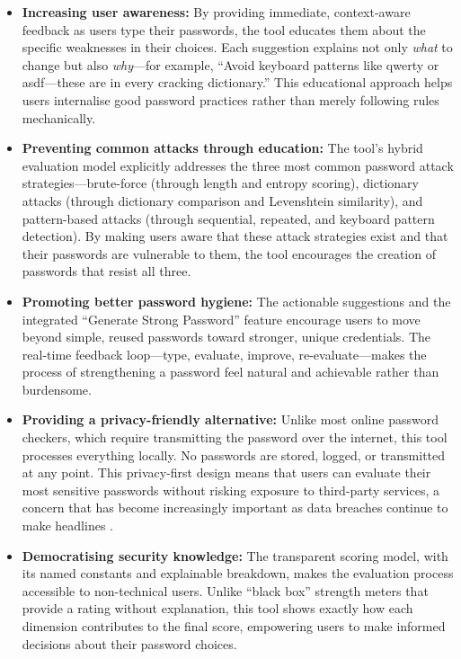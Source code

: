 \begin{itemize}
    \item \textbf{Increasing user awareness:} By providing immediate, context-aware feedback as users type their passwords, the tool educates them about the specific weaknesses in their choices. Each suggestion explains not only \textit{what} to change but also \textit{why}---for example, ``Avoid keyboard patterns like qwerty or asdf---these are in every cracking dictionary.'' This educational approach helps users internalise good password practices rather than merely following rules mechanically.

    \item \textbf{Preventing common attacks through education:} The tool's hybrid evaluation model explicitly addresses the three most common password attack strategies---brute-force (through length and entropy scoring), dictionary attacks (through dictionary comparison and Levenshtein similarity), and pattern-based attacks (through sequential, repeated, and keyboard pattern detection). By making users aware that these attack strategies exist and that their passwords are vulnerable to them, the tool encourages the creation of passwords that resist all three.

    \item \textbf{Promoting better password hygiene:} The actionable suggestions and the integrated ``Generate Strong Password'' feature encourage users to move beyond simple, reused passwords toward stronger, unique credentials. The real-time feedback loop---type, evaluate, improve, re-evaluate---makes the process of strengthening a password feel natural and achievable rather than burdensome.

    \item \textbf{Providing a privacy-friendly alternative:} Unlike most online password checkers, which require transmitting the password over the internet, this tool processes everything locally. No passwords are stored, logged, or transmitted at any point. This privacy-first design means that users can evaluate their most sensitive passwords without risking exposure to third-party services, a concern that has become increasingly important as data breaches continue to make headlines \cite{verizon2024}.

    \item \textbf{Democratising security knowledge:} The transparent scoring model, with its named constants and explainable breakdown, makes the evaluation process accessible to non-technical users. Unlike ``black box'' strength meters that provide a rating without explanation, this tool shows exactly how each dimension contributes to the final score, empowering users to make informed decisions about their password choices.
\end{itemize}

